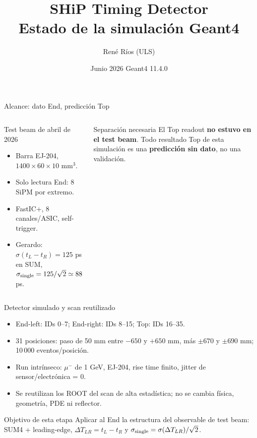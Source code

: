 \documentclass[aspectratio=169]{beamer}
\title{SHiP Timing Detector\\Estado de la simulación Geant4}
\author{René Ríos (ULS)}
\institute{Revisión de supervisor / SHiP Collaboration Meeting}
\date{Junio 2026 \quad Geant4 11.4.0}
\begin{document}
\begin{frame}
  \titlepage
\end{frame}

\begin{frame}{Alcance: dato End, predicción Top}
  \begin{columns}[T]
    \begin{block}{Test beam de abril de 2026}
      \begin{itemize}
        \item Barra EJ-204, $1400\times60\times10$ mm$^3$.
        \item Solo lectura End: 8 SiPM por extremo.
        \item FastIC+, 8 canales/ASIC, self-trigger.
        \item Gerardo: $\sigma(t_L-t_R)=125$ ps en SUM,
          $\sigma_{\rm single}=125/\sqrt{2}\simeq88$ ps.
      \end{itemize}
    \end{block}
    \begin{alertblock}{Separación necesaria}
      El Top readout \textbf{no estuvo en el test beam}. Todo resultado Top de
      esta simulación es una \textbf{predicción sin dato}, no una validación.
    \end{alertblock}
  \end{columns}
\end{frame}

\begin{frame}{Detector simulado y scan reutilizado}
  \begin{itemize}
    \item End-left: IDs 0--7; End-right: IDs 8--15; Top: IDs 16--35.
    \item 31 posiciones: paso de 50 mm entre $-650$ y $+650$ mm, más
      $\pm670$ y $\pm690$ mm; 10\,000 eventos/posición.
    \item Run intrínseco: $\mu^-$ de 1 GeV, EJ-204, rise time finito,
      jitter de sensor/electrónica = 0.
    \item Se reutilizan los ROOT del scan de alta estadística; no se cambia
      física, geometría, PDE ni reflector.
  \end{itemize}
  \begin{block}{Objetivo de esta etapa}
    Aplicar al End la estructura del observable de test beam:
    SUM4 + leading-edge, $\Delta T_{LR}=t_L-t_R$ y
    $\sigma_{\rm single}=\sigma(\Delta T_{LR})/\sqrt{2}$.
  \end{block}
\end{frame}
\end{document}
